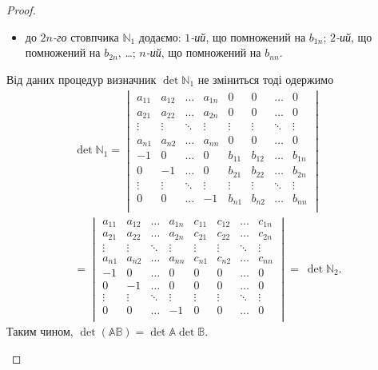 \documentclass{math_library}
\begin{document}
\begin{proof}
\begin{enumerate}[topsep=0pt,wide=0pt,label={\arabic*)}]
\begin{itemize}[nosep,wide=0pt,label={--}]
\vdots 
\item до $2n$\textit{-го} стовпчика $\mathbb{N}_1$ додаємо: $1$\textit{-ий}, що помножений на $b_{1n}$; $2$\textit{-ий}, що помножений на $b_{2n}$, \dots ; $n$\textit{-ий}, що помножений на $b_{nn}$.
\end{itemize}
Від даних процедур визначник $\det \mathbb{N}_1$ не зміниться тоді одержимо
\begin{multline*}
\det \mathbb{N}_1 = \begin{vmatrix}
a_{11} & a_{12} & \dots & a_{1n} & 0 & 0 & \dots & 0 \\
a_{21} & a_{22} & \dots & a_{2n} & 0 & 0 & \dots & 0 \\
\vdots & \vdots & \ddots & \vdots & \vdots & \vdots & \ddots & \vdots \\
a_{n1} & a_{n2} & \dots & a_{nn} & 0 & 0 & \dots & 0 \\
-1 & 0 & \dots & 0 & b_{11} & b_{12} & \dots & b_{1n} \\
0 & -1 & \dots & 0 & b_{21} & b_{22} & \dots & b_{2n} \\
\vdots & \vdots & \ddots & \vdots & \vdots & \vdots & \ddots & \vdots \\
0 & 0 & \dots & -1 & b_{n1} & b_{n2} & \dots & b_{nn} \\
\end{vmatrix} \\
= \begin{vmatrix}
a_{11} & a_{12} & \dots & a_{1n} & c_{11} & c_{12} & \dots & c_{1n} \\
a_{21} & a_{22} & \dots & a_{2n} & c_{21} & c_{22} & \dots & c_{2n} \\
\vdots & \vdots & \ddots & \vdots & \vdots & \vdots & \ddots & \vdots \\
a_{n1} & a_{n2} & \dots & a_{nn} & c_{n1} & c_{n2} & \dots & c_{nn} \\
-1 & 0 & \dots & 0 & 0 & 0 & \dots & 0 \\
0 & -1 & \dots & 0 & 0 & 0 & \dots & 0 \\
\vdots & \vdots & \ddots & \vdots & \vdots & \vdots & \ddots & \vdots \\
0 & 0 & \dots & -1 & 0 & 0 & \dots & 0 \\
\end{vmatrix} =~ \det \mathbb{N}_2.
\end{multline*}
Таким чином, $\det (\mathbb{A} \mathbb{B}) = \det \mathbb{A} \det \mathbb{B}$. \qedhere
\end{enumerate}
\end{proof}
\end{document}
